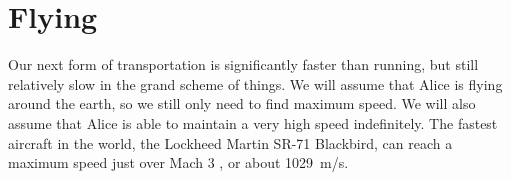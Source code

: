 \section{Flying}
	Our next form of transportation is significantly faster than running, but still relatively slow in the grand scheme of things. We will assume that Alice is flying around the earth, so we still only need to find maximum speed. We will also assume that Alice is able to maintain a very high speed indefinitely. The fastest aircraft in the world, the Lockheed Martin SR-71 Blackbird, can reach a maximum speed just over Mach 3 \autocite{aircraftSpeed}, or about \SI{1029}{\metre/\second}.
